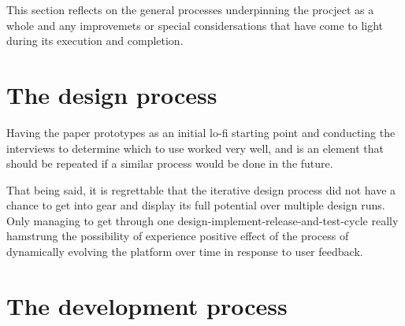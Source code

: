 
This section reflects on the general processes underpinning the procject as a
whole and any improvemets or special considersations that have come to light
during its execution and completion.
%

%
%

\section{The design process}

  Having the paper prototypes as an initial lo-fi starting point and conducting
  the interviews to determine which to use worked very well, and is an element
  that should be repeated if a similar process would be done in the future.

  That being said, it is regrettable that the iterative design process did not
  have a chance to get into gear and display its full potential over multiple
  design runs. Only managing to get through one
  design-implement-release-and-test-cycle really hamstrung the possibility of
  experience positive effect of the process of dynamically evolving the
  platform over time in response to user feedback.

\section{The development process}

